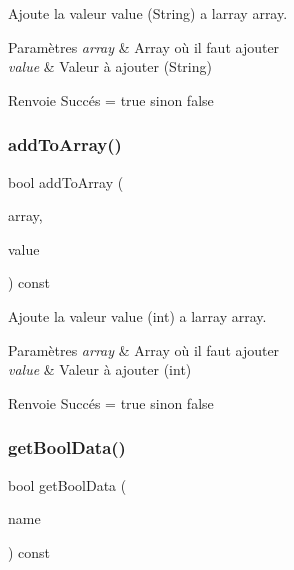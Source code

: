 Ajoute la valeur value (String) a l\textquotesingle{}array array. 


\begin{DoxyParams}{Paramètres}
{\em array} & Array où il faut ajouter \\
\hline
{\em value} & Valeur à ajouter (String) \\
\hline
\end{DoxyParams}
\begin{DoxyReturn}{Renvoie}
Succés = true sinon false 
\end{DoxyReturn}
\mbox{\label{classDataManager_ae853a46801f77c83528be95b19cf271b}} 
\subsubsection{\texorpdfstring{add\+To\+Array()}{addToArray()}\hspace{0.1cm}{\footnotesize\ttfamily [2/2]}}
{\footnotesize\ttfamily bool add\+To\+Array (\begin{DoxyParamCaption}\item[{const Q\+String}]{array,  }\item[{const int}]{value }\end{DoxyParamCaption}) const\hspace{0.3cm}{\ttfamily [inline]}}



Ajoute la valeur value (int) a l\textquotesingle{}array array. 


\begin{DoxyParams}{Paramètres}
{\em array} & Array où il faut ajouter \\
\hline
{\em value} & Valeur à ajouter (int) \\
\hline
\end{DoxyParams}
\begin{DoxyReturn}{Renvoie}
Succés = true sinon false 
\end{DoxyReturn}
\mbox{\label{classDataManager_a70a1a322edd474e7df74ce2f06d8722d}} 
\subsubsection{\texorpdfstring{get\+Bool\+Data()}{getBoolData()}}
{\footnotesize\ttfamily bool get\+Bool\+Data (\begin{DoxyParamCaption}\item[{const Q\+String}]{name }\end{DoxyParamCaption}) const\hspace{0.3cm}{\ttfamily [inline]}}



